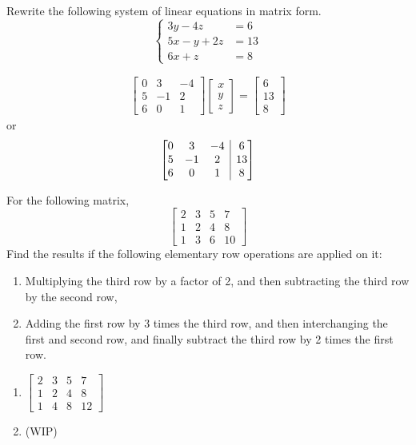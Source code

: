 \begin{Exercise}
Rewrite the following system of linear equations in matrix form.
\begin{equation*}
\begin{cases}
3y - 4z &= 6\\
5x - y + 2z &= 13\\
6x + z &= 8
\end{cases}
\end{equation*}
\end{Exercise}
\begin{Answer}
\begin{align*}
\begin{bmatrix}
0 & 3 & -4 \\
5 & -1 & 2 \\
6 & 0 & 1
\end{bmatrix}
\begin{bmatrix}
x \\
y \\
z
\end{bmatrix}
=
\begin{bmatrix}
6 \\ 
13 \\
8
\end{bmatrix}    
\end{align*}
or
\begin{align*}
\left[\begin{array}{@{}ccc|c@{}}
0 & 3 & -4 & 6 \\
5 & -1 & 2 & 13 \\
6 & 0 & 1 & 8
\end{array}\right]    
\end{align*}
\end{Answer}

\begin{Exercise}
For the following matrix,
\[
\begin{bmatrix}
2 & 3 & 5 & 7\\
1 & 2 & 4 & 8\\
1 & 3 & 6 & 10
\end{bmatrix}
\]
Find the results if the following elementary row operations are applied on it: 
\begin{enumerate}[label=(\alph*)]
\item Multiplying the third row by a factor of 2, and then subtracting the third row by the second row,
\item Adding the first row by 3 times the third row, and then interchanging the first and second row, and finally subtract the third row by 2 times the first row.\\
\end{enumerate}
\end{Exercise}
\begin{Answer}
\begin{enumerate}[label=(\alph*)]
\item $\begin{bmatrix}
2 & 3 & 5 & 7 \\
1 & 2 & 4 & 8 \\
1 & 4 & 8 & 12
\end{bmatrix}$
\item (WIP)
\end{enumerate}
\end{Answer}

